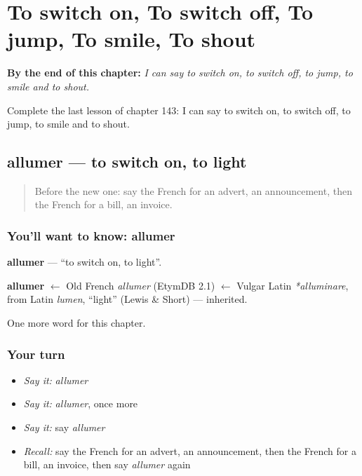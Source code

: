 
\chapter{To switch on, To switch off, To jump, To smile, To shout}
\label{ch:fr-to-switch-on-to-switch-off-to-jump-to-smile-to-shout}

\begin{chapteropening}
\textbf{By the end of this chapter:} \emph{I can say to switch on, to switch off, to jump, to smile and to shout.}

Complete the last lesson of chapter 143: I can say to switch on, to switch off, to jump, to smile and to shout.
\end{chapteropening}

\section[allumer]{allumer — to switch on, to light}

\label{lesson:FR-C143-allumer}



\begin{quote}
Before the new one: say the French for an advert, an announcement, then the French for a bill, an invoice.
\end{quote}

\subsection*{You'll want to know: allumer}
\textbf{allumer} — \textquotedblleft{}to switch on, to light\textquotedblright{}.

\begin{cousinweb}
\textbf{allumer} $\leftarrow$ Old French \emph{allumer} (EtymDB 2.1) $\leftarrow$ Vulgar Latin \emph{*alluminare}, from Latin \emph{lumen}, \textquotedblleft{}light\textquotedblright{} (Lewis \& Short) — inherited.
\end{cousinweb}

\begin{grammarlens}[title={What you've built}]
One more word for this chapter.
\end{grammarlens}

\subsection*{Your turn}
\begin{itemize}
\raggedright
  \item \emph{Say it:} \emph{allumer}
  \item \emph{Say it:} \emph{allumer}, once more
  \item \emph{Say it:} say \emph{allumer}
  \item \emph{Recall:} say the French for an advert, an announcement, then the French for a bill, an invoice, then say \emph{allumer} again
\end{itemize}


